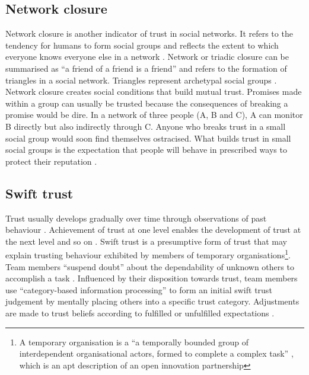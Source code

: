 \subsection{Network closure}

Network closure is another indicator of trust in social networks. It refers to the tendency for humans to form social groups and reflects the extent to which everyone knows everyone else in a network \citep{coleman1990foundations}. Network or triadic closure can be summarised as \enquote{a friend of a friend is a friend} and refers to the formation of triangles in a social network. Triangles represent archetypal social groups \citep{robins2015doing}. Network closure creates social conditions that build mutual trust. Promises made within a group can usually be trusted because the consequences of breaking a promise would be dire. In a network of three people (A, B and C), A can monitor B directly but also indirectly through C. Anyone who breaks trust in a small social group would soon find themselves ostracised. What builds trust in small social groups is the expectation that people will behave in prescribed ways to protect their reputation \citep{burt2005brokerage}. 

\subsection{Swift trust}

Trust usually develops gradually over time through observations of past behaviour \citep{mayer1995integrative}. Achievement of trust at one level enables the development of trust at the next level and so on \citep{robert2009individual}. Swift trust is a presumptive form of trust that may explain trusting behaviour exhibited by members of temporary organisations\footnote{A temporary organisation is a \enquote{a temporally bounded group of interdependent organisational actors, formed to complete a complex task} \citep{burke2016temporary}, which is an apt description of an open innovation partnership}. Team members \enquote{suspend doubt} about the dependability of unknown others to accomplish a task \citep{germain2014role}. Influenced by their disposition towards trust, team members use \enquote{category-based information processing} to form an initial swift trust judgement by mentally placing others into a specific trust category. Adjustments are made to trust beliefs according to fulfilled or unfulfilled expectations \citep{meyerson1996swift,robert2009individual}. \medskip

